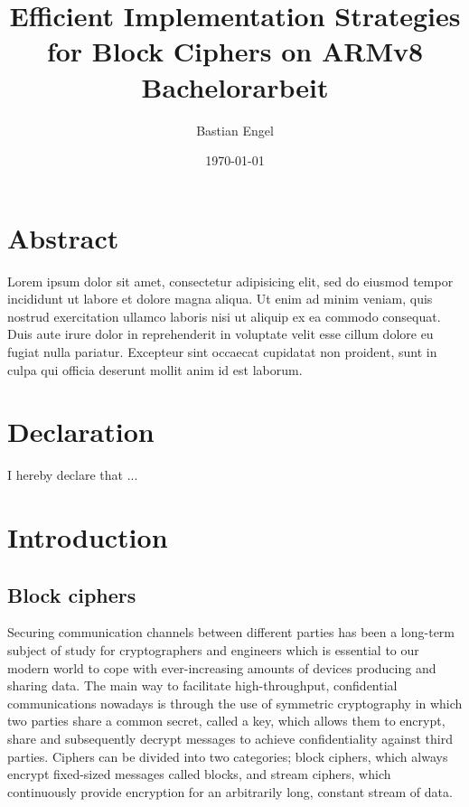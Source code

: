 \documentclass[12pt]{report}
\title{
    \textbf{Efficient Implementation Strategies for Block Ciphers on ARMv8}\\
    {\footnotesize Bachelorarbeit}
}
\author{Bastian Engel}
\date{\today}
\begin{document}
\maketitle

\chapter*{Abstract}

Lorem ipsum dolor \cite{gift:2017} sit amet, consectetur adipisicing elit, sed do eiusmod tempor
incididunt ut labore et dolore magna aliqua. Ut enim ad minim veniam, quis
nostrud exercitation ullamco laboris nisi ut aliquip ex ea commodo consequat.
Duis aute irure dolor in reprehenderit in voluptate velit esse cillum dolore eu
fugiat nulla pariatur. Excepteur sint occaecat cupidatat non proident, sunt in
culpa qui officia deserunt mollit anim id est laborum.

\chapter*{Declaration}

I hereby declare that ...

\tableofcontents

\chapter{Introduction}
\section{Block ciphers}

Securing communication channels between different parties has been a long-term
subject of study for cryptographers and engineers which is essential to our
modern world to cope with ever-increasing amounts of devices producing and
sharing data. The main way to facilitate high-throughput, confidential
communications nowadays is through the use of symmetric cryptography in which
two parties share a common secret, called a key, which allows them to encrypt,
share and subsequently decrypt messages to achieve confidentiality against
third parties. Ciphers can be divided into two categories; block ciphers, which
always encrypt fixed-sized messages called blocks, and stream ciphers, which
continuously provide encryption for an arbitrarily long, constant stream of
data.
\end{document}
